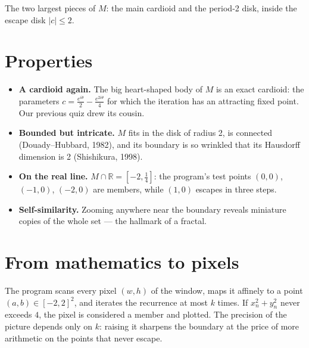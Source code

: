 \documentclass[11pt]{article}
\begin{document}
\begin{center}

\smallskip
The two largest pieces of $M$: the main cardioid and the period-2 disk,
inside the escape disk $|c| \leq 2$.
\end{center}

\section{Properties}

\begin{itemize}
  \item \textbf{A cardioid again.} The big heart-shaped body of $M$ is an
    exact cardioid: the parameters $c = \frac{e^{i\theta}}{2} -
    \frac{e^{2i\theta}}{4}$ for which the iteration has an attracting fixed
    point. Our previous quiz drew its cousin.
  \item \textbf{Bounded but intricate.} $M$ fits in the disk of radius 2, is
    connected (Douady--Hubbard, 1982), and its boundary is so wrinkled that
    its Hausdorff dimension is 2 (Shishikura, 1998).
  \item \textbf{On the real line.} $M \cap \mathbb{R} = [-2, \tfrac14]$: the
    program's test points $(0,0)$, $(-1,0)$, $(-2,0)$ are members, while
    $(1, 0)$ escapes in three steps.
  \item \textbf{Self-similarity.} Zooming anywhere near the boundary reveals
    miniature copies of the whole set --- the hallmark of a fractal.
\end{itemize}

\section{From mathematics to pixels}

The program scans every pixel $(w, h)$ of the window, maps it affinely to a
point $(a, b) \in [-2, 2]^2$, and iterates the recurrence at most $k$ times.
If $x_n^2 + y_n^2$ never exceeds $4$, the pixel is considered a member and
plotted. The precision of the picture depends only on $k$: raising it sharpens
the boundary at the price of more arithmetic on the points that never escape.
\end{document}
